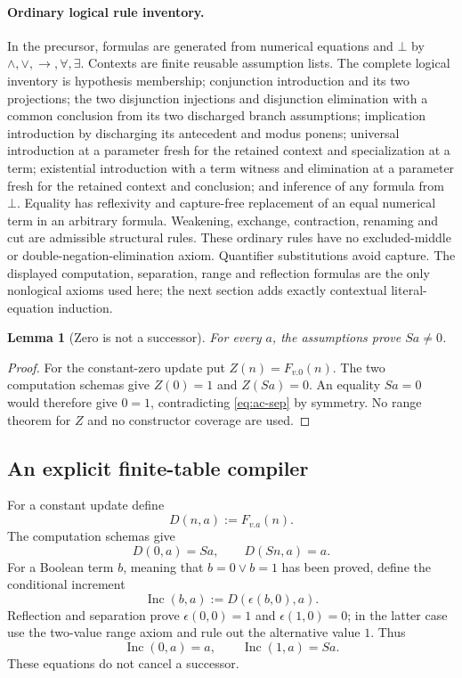 \documentclass[11pt,letterpaper]{article}
\newtheorem{lemma}[theorem]{Lemma}
\theoremstyle{definition}\newtheorem{definition}[theorem]{Definition}
\theoremstyle{remark}\newtheorem{remark}[theorem]{Remark}
\begin{document}
\paragraph{Ordinary logical rule inventory.}
In the precursor, formulas are generated from numerical equations and
$\bot$ by $\land,\lor,\to,\forall,\exists$. Contexts are finite reusable
assumption lists. The complete logical inventory is hypothesis membership;
conjunction introduction and its two projections; the two disjunction
injections and disjunction elimination with a common conclusion from its
two discharged branch assumptions; implication introduction by discharging
its antecedent and modus ponens; universal introduction at a parameter
fresh for the retained context and specialization at a term; existential
introduction with a term witness and elimination at a parameter fresh for
the retained context and conclusion; and inference of any formula from
$\bot$. Equality has reflexivity and capture-free replacement of an equal
numerical term in an arbitrary formula. Weakening, exchange, contraction,
renaming and cut are admissible structural rules. These ordinary rules
have no excluded-middle or double-negation-elimination axiom. Quantifier
substitutions avoid capture. The displayed computation, separation,
range and reflection formulas are the only nonlogical axioms used here;
the next section adds exactly contextual literal-equation induction.

\begin{lemma}[Zero is not a successor]
\label{lem:ac-zero}
For every $a$, the assumptions prove $Sa\ne0$.
\end{lemma}
\begin{proof}
For the constant-zero update put $Z(n)=F_{v.0}(n)$. The two computation
schemas give $Z(0)=1$ and $Z(Sa)=0$. An equality $Sa=0$ would therefore
give $0=1$, contradicting \eqref{eq:ac-sep} by symmetry. No range theorem
for $Z$ and no constructor coverage are used.
\end{proof}

\subsection{An explicit finite-table compiler}

For a constant update define
\[
 D(n,a):=F_{v.a}(n).
\]
The computation schemas give
\[
 D(0,a)=Sa,\qquad D(Sn,a)=a.
\]
For a Boolean term $b$, meaning that $b=0\lor b=1$ has been proved,
define the conditional increment
\[
 \operatorname{Inc}(b,a):=D(\epsilon(b,0),a).
\]
Reflection and separation prove $\epsilon(0,0)=1$ and
$\epsilon(1,0)=0$; in the latter case use the two-value range axiom and
rule out the alternative value $1$. Thus
\begin{equation}
 \operatorname{Inc}(0,a)=a,\qquad
 \operatorname{Inc}(1,a)=Sa.
 \label{eq:ac-inc}
\end{equation}
These equations do not cancel a successor.
\end{document}
